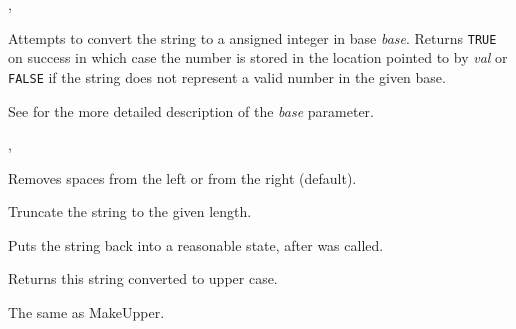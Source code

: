
,\\

\label{wxstringtoulong}


Attempts to convert the string to a ansigned integer in base {\it base}.
Returns {\tt TRUE} on success in which case the number is stored in the
location pointed to by {\it val} or {\tt FALSE} if the string does not
represent a valid number in the given base.

See  for the more detailed
description of the {\it base} parameter.


,\\

\label{wxstringtrim}


Removes spaces from the left or from the right (default).

\label{wxstringtruncate}


Truncate the string to the given length.

\label{wxstringungetwritebuf}



Puts the string back into a reasonable state, after
\rtfsp{} was called.

\label{wxstringupper}


Returns this string converted to upper case.

\label{wxstringuppercase}


The same as MakeUpper.

